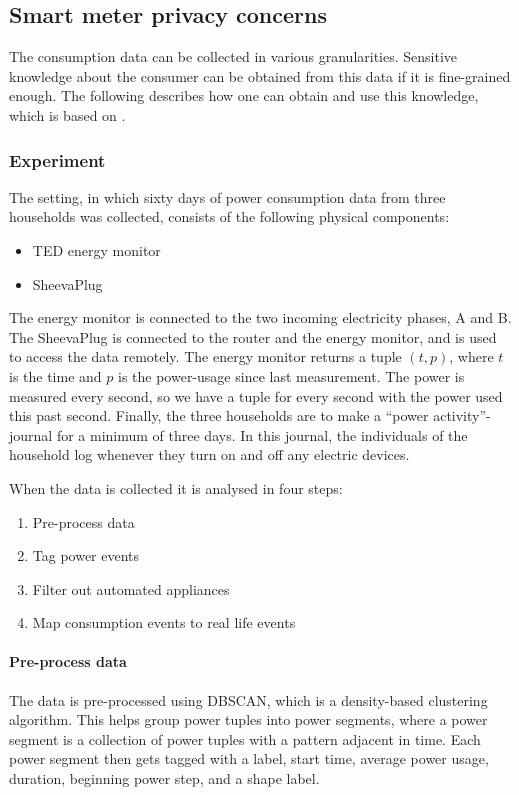 \subsection{Smart meter privacy concerns}\label{smart_meter_privacy}
The consumption data can be collected in various granularities.
Sensitive knowledge about the consumer can be obtained from this data if it is fine-grained enough.
The following describes how one can obtain and use this knowledge, which is based on \citet{privacy_memoir}.

\subsubsection{Experiment}
The setting, in which sixty days of power consumption data from three households was collected, consists of the following physical components:
\begin{itemize}
\item TED energy monitor
\item SheevaPlug
\end{itemize}
The energy monitor is connected to the two incoming electricity phases, A and B.\cite{TED_installation_guide}
The SheevaPlug is connected to the router and the energy monitor, and is used to access the data remotely.
The energy monitor returns a tuple $(t,p)$, where $t$ is the time and $p$ is the power-usage since last measurement.
The power is measured every second, so we have a tuple for every second with the power used this past second.
Finally, the three households are to make a ``power activity''-journal for a minimum of three days.
In this journal, the individuals of the household log whenever they turn on and off any electric devices.

When the data is collected it is analysed in four steps:
\begin{enumerate}
\item Pre-process data
\item Tag power events
\item Filter out automated appliances
\item Map consumption events to real life events
\end{enumerate}

\paragraph{Pre-process data}
The data is pre-processed using DBSCAN, which is a density-based clustering algorithm.
This helps group power tuples into power segments, where a power segment is a collection of power tuples with a pattern adjacent in time.
Each power segment then gets tagged with a label, start time, average power usage, duration, beginning power step, and a shape label.

